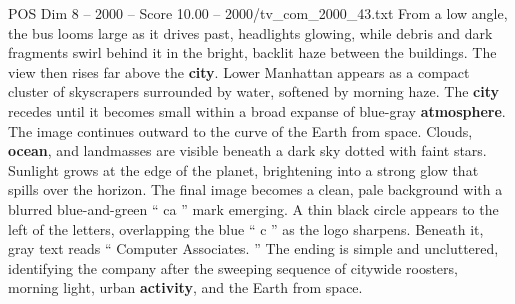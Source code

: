 \begin{textsample}{POS Dim 8 – 2000 – Score 10.00 – 2000/tv\_com\_2000\_43.txt}
From a low angle, the bus looms large as it drives past, headlights glowing, while debris and dark fragments swirl behind it in the bright, backlit haze between the buildings.
The view then rises far above the \textbf{city}.
Lower Manhattan appears as a compact cluster of skyscrapers surrounded by water, softened by morning haze.
The \textbf{city} recedes until it becomes small within a broad expanse of blue-gray \textbf{atmosphere}.
The image continues outward to the curve of the Earth from space.
Clouds, \textbf{ocean}, and landmasses are visible beneath a dark sky dotted with faint stars.
Sunlight grows at the edge of the planet, brightening into a strong glow that spills over the horizon.
The final image becomes a clean, pale background with a blurred blue-and-green “ ca ” mark emerging.
A thin black circle appears to the left of the letters, overlapping the blue “ c ” as the logo sharpens.
Beneath it, gray text reads “ Computer Associates. ” The ending is simple and uncluttered, identifying the company after the sweeping sequence of citywide roosters, morning light, urban \textbf{activity}, and the Earth from space.

\end{textsample}
